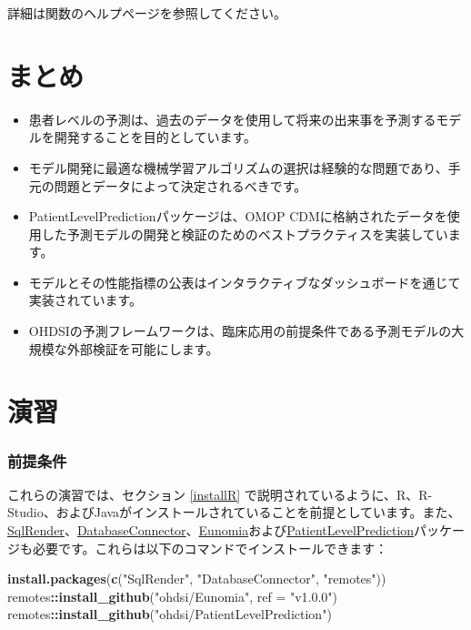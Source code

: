 \documentclass[
  11pt]{book}
\makeatletter
\newenvironment{Shaded}{\begin{snugshade}}{\end{snugshade}}
\newcommand{\AttributeTok}[1]{\textcolor[rgb]{0.13,0.29,0.53}{#1}}
\newcommand{\FunctionTok}[1]{\textcolor[rgb]{0.13,0.29,0.53}{\textbf{#1}}}
\newcommand{\NormalTok}[1]{#1}
\newcommand{\SpecialCharTok}[1]{\textcolor[rgb]{0.81,0.36,0.00}{\textbf{#1}}}
\newcommand{\StringTok}[1]{\textcolor[rgb]{0.31,0.60,0.02}{#1}}
\newenvironment{kframe}{%
\medskip{}
\setlength{\fboxsep}{.8em}
 \def\at@end@of@kframe{}%
 \ifinner\ifhmode%
  \def\at@end@of@kframe{\end{minipage}}%
  \begin{minipage}{\columnwidth}%
 \fi\fi%
 \def\FrameCommand##1{\hskip\@totalleftmargin \hskip-\fboxsep
 \colorbox{myShadeColor}{##1}\hskip-\fboxsep
     \hskip-\linewidth \hskip-\@totalleftmargin \hskip\columnwidth}%
 \MakeFramed {\advance\hsize-\width
   \@totalleftmargin\z@ \linewidth\hsize
   \@setminipage}}%
 {\par\unskip\endMakeFramed%
 \at@end@of@kframe}
\newenvironment{rmdblock}[1]
  {
  \begin{itemize}
  \renewcommand{\labelitemi}{
    \raisebox{-.7\height}[0pt][0pt]{
      {\setkeys{Gin}{width=3em,keepaspectratio}\texttt{[image: images/\#1]}}
    }
  }
  \setlength{\fboxsep}{1em}
  \begin{kframe}
  \item
  }
  {
  \end{kframe}
  \end{itemize}
  }
\newenvironment{rmdsummary}
  {\begin{rmdblock}{summary}}
  {\end{rmdblock}}
\theoremstyle{definition}
\theoremstyle{definition}
\theoremstyle{definition}
\theoremstyle{definition}
\theoremstyle{remark}
\makeatother
\begin{document}
詳細は関数のヘルプページを参照してください。

\section{まとめ}\label{ux307eux3068ux3081-10}

\begin{rmdsummary}
\begin{itemize}
\item
  患者レベルの予測は、過去のデータを使用して将来の出来事を予測するモデルを開発することを目的としています。
\item
  モデル開発に最適な機械学習アルゴリズムの選択は経験的な問題であり、手元の問題とデータによって決定されるべきです。
\item
  PatientLevelPredictionパッケージは、OMOP CDMに格納されたデータを使用した予測モデルの開発と検証のためのベストプラクティスを実装しています。
\item
  モデルとその性能指標の公表はインタラクティブなダッシュボードを通じて実装されています。
\item
  OHDSIの予測フレームワークは、臨床応用の前提条件である予測モデルの大規模な外部検証を可能にします。
\end{itemize}
\end{rmdsummary}

\section{演習}\label{ux6f14ux7fd2-8}

\subsubsection*{前提条件}\label{ux524dux63d0ux6761ux4ef6-8}

これらの演習では、セクション \ref{installR} で説明されているように、R、R-Studio、およびJavaがインストールされていることを前提としています。また、\href{https://ohdsi.github.io/SqlRender/}{SqlRender}、\href{https://ohdsi.github.io/DatabaseConnector/}{DatabaseConnector}、\href{https://ohdsi.github.io/Eunomia/}{Eunomia}および\href{https://ohdsi.github.io/PatientLevelPrediction/}{PatientLevelPrediction}パッケージも必要です。これらは以下のコマンドでインストールできます：

\begin{Shaded}
\begin{Highlighting}[]
\FunctionTok{install.packages}\NormalTok{(}\FunctionTok{c}\NormalTok{(}\StringTok{"SqlRender"}\NormalTok{, }\StringTok{"DatabaseConnector"}\NormalTok{, }\StringTok{"remotes"}\NormalTok{))}
\NormalTok{remotes}\SpecialCharTok{::}\FunctionTok{install\_github}\NormalTok{(}\StringTok{"ohdsi/Eunomia"}\NormalTok{, }\AttributeTok{ref =} \StringTok{"v1.0.0"}\NormalTok{)}
\NormalTok{remotes}\SpecialCharTok{::}\FunctionTok{install\_github}\NormalTok{(}\StringTok{"ohdsi/PatientLevelPrediction"}\NormalTok{)}
\end{Highlighting}
\end{Shaded}
\end{document}

